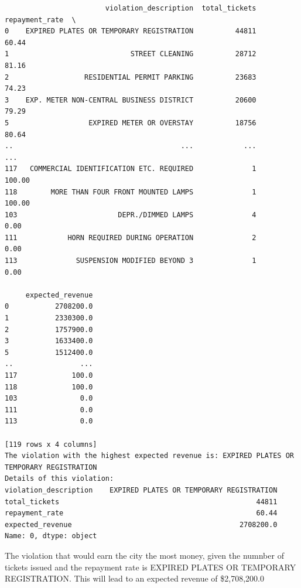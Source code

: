 \documentclass[
  letterpaper,
  DIV=11,
  numbers=noendperiod]{scrartcl}
\begin{document}
\begin{verbatim}
                        violation_description  total_tickets  repayment_rate  \
0    EXPIRED PLATES OR TEMPORARY REGISTRATION          44811           60.44   
1                             STREET CLEANING          28712           81.16   
2                  RESIDENTIAL PERMIT PARKING          23683           74.23   
3    EXP. METER NON-CENTRAL BUSINESS DISTRICT          20600           79.29   
5                   EXPIRED METER OR OVERSTAY          18756           80.64   
..                                        ...            ...             ...   
117   COMMERCIAL IDENTIFICATION ETC. REQUIRED              1          100.00   
118        MORE THAN FOUR FRONT MOUNTED LAMPS              1          100.00   
103                        DEPR./DIMMED LAMPS              4            0.00   
111            HORN REQUIRED DURING OPERATION              2            0.00   
113              SUSPENSION MODIFIED BEYOND 3              1            0.00   

     expected_revenue  
0           2708200.0  
1           2330300.0  
2           1757900.0  
3           1633400.0  
5           1512400.0  
..                ...  
117             100.0  
118             100.0  
103               0.0  
111               0.0  
113               0.0  

[119 rows x 4 columns]
The violation with the highest expected revenue is: EXPIRED PLATES OR TEMPORARY REGISTRATION
Details of this violation:
violation_description    EXPIRED PLATES OR TEMPORARY REGISTRATION
total_tickets                                               44811
repayment_rate                                              60.44
expected_revenue                                        2708200.0
Name: 0, dtype: object
\end{verbatim}

The violation that would earn the city the most money, given the numnber
of tickets issued and the repayment rate is EXPIRED PLATES OR TEMPORARY
REGISTRATION. This will lead to an expected revenue of \$2,708,200.0
\end{document}
